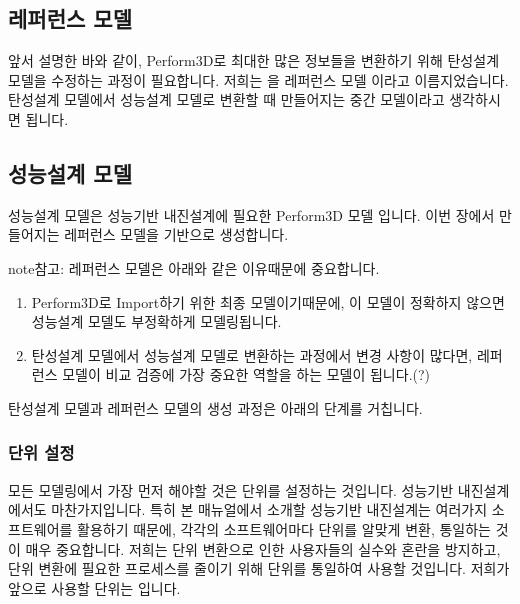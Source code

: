 \documentclass[a4paper,10pt,korean]{sphinxmanual}
\begin{document}
\subsection{레퍼런스 모델}
\label{\detokenize{1_ref_model:id3}}
\sphinxAtStartPar
앞서 설명한 바와 같이, Perform\sphinxhyphen{}3D로 최대한 많은 정보들을 변환하기 위해 탄성설계 모델을 수정하는 과정이 필요합니다.
저희는  을 레퍼런스 모델 이라고 이름지었습니다.
탄성설계 모델에서 성능설계 모델로 변환할 때 만들어지는 중간 모델이라고 생각하시면 됩니다.


\subsection{성능설계 모델}
\label{\detokenize{1_ref_model:id4}}
\sphinxAtStartPar
성능설계 모델은 성능기반 내진설계에 필요한 Perform\sphinxhyphen{}3D 모델 입니다.
이번 장에서 만들어지는 레퍼런스 모델을 기반으로 생성합니다.

\begin{sphinxadmonition}{note}{참고:}
\sphinxAtStartPar
레퍼런스 모델은 아래와 같은 이유때문에 중요합니다.
\begin{enumerate}
%
\item {} 
\sphinxAtStartPar
Perform\sphinxhyphen{}3D로 Import하기 위한 최종 모델이기때문에, 이 모델이 정확하지 않으면 성능설계 모델도 부정확하게 모델링됩니다.

\item {} 
\sphinxAtStartPar
탄성설계 모델에서 성능설계 모델로 변환하는 과정에서 변경 사항이 많다면, 레퍼런스 모델이 비교 검증에 가장 중요한 역할을 하는 모델이 됩니다.(?)

\end{enumerate}
\end{sphinxadmonition}

\sphinxAtStartPar
탄성설계 모델과 레퍼런스 모델의 생성 과정은 아래의 단계를 거칩니다.

\sphinxstepscope


\subsubsection{단위 설정}
\label{\detokenize{1_unit_setting:id1}}\label{\detokenize{1_unit_setting::doc}}
\sphinxAtStartPar
모든 모델링에서 가장 먼저 해야할 것은 단위를 설정하는 것입니다. 성능기반 내진설계에서도 마찬가지입니다.
특히 본 매뉴얼에서 소개할 성능기반 내진설계는 여러가지 소프트웨어를 활용하기 때문에, 각각의 소프트웨어마다 단위를 알맞게 변환, 통일하는 것이
매우 중요합니다. 저희는 단위 변환으로 인한 사용자들의 실수와 혼란을 방지하고, 단위 변환에 필요한 프로세스를 줄이기 위해 단위를 통일하여 사용할 것입니다.
저희가 앞으로 사용할 단위는  입니다.
\end{document}
